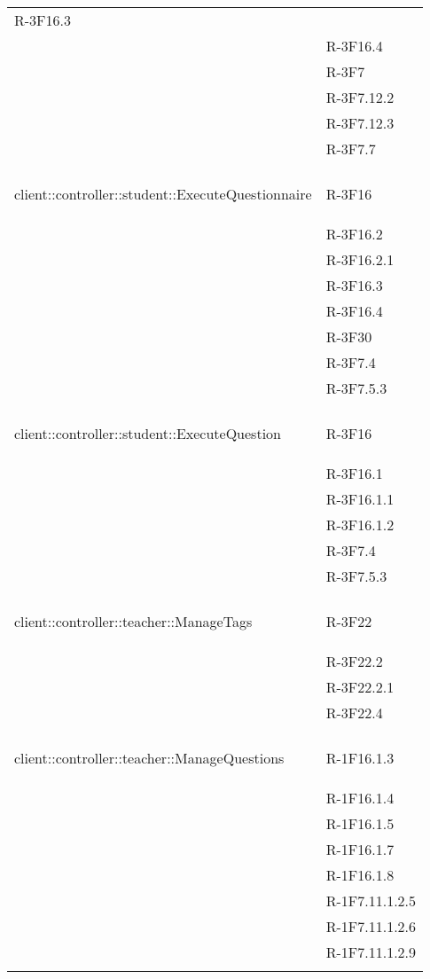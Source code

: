 \begin{longtable}{l p{3cm}}
	R-3F16.3 \tabularnewline &
	
	R-3F16.4 \tabularnewline &
	
	R-3F7 \tabularnewline &
	
	R-3F7.12.2 \tabularnewline &
	
	R-3F7.12.3 \tabularnewline &
	
	R-3F7.7 \tabularnewline &\tabularnewline
	\hline
	\hypertarget{client::controller::student::ExecuteQuestionnaire}{client::controller::student::ExecuteQuestionnaire} & R-3F16 \tabularnewline &
	
	R-3F16.2 \tabularnewline &
	
	R-3F16.2.1 \tabularnewline &
	
	R-3F16.3 \tabularnewline &
	
	R-3F16.4 \tabularnewline &
	
	R-3F30 \tabularnewline &
	
	R-3F7.4 \tabularnewline &
	
	R-3F7.5.3 \tabularnewline &\tabularnewline
	\hline
	\hypertarget{client::controller::student::ExecuteQuestion}{client::controller::student::ExecuteQuestion} & R-3F16 \tabularnewline &
	
	R-3F16.1 \tabularnewline &
	
	R-3F16.1.1 \tabularnewline &
	
	R-3F16.1.2 \tabularnewline &
	
	R-3F7.4 \tabularnewline &
	
	R-3F7.5.3 \tabularnewline &\tabularnewline
	\hline
	\hypertarget{client::controller::teacher::ManageTags}{client::controller::teacher::ManageTags} & R-3F22 \tabularnewline &
	
	R-3F22.2 \tabularnewline &
	
	R-3F22.2.1 \tabularnewline &
	
	R-3F22.4 \tabularnewline &\tabularnewline
	\hline
	\hypertarget{client::controller::teacher::ManageQuestions}{client::controller::teacher::ManageQuestions} & R-1F16.1.3 \tabularnewline &
	
	R-1F16.1.4 \tabularnewline &
	
	R-1F16.1.5 \tabularnewline &
	
	R-1F16.1.7 \tabularnewline &
	
	R-1F16.1.8 \tabularnewline &
	
	R-1F7.11.1.2.5 \tabularnewline &
	
	R-1F7.11.1.2.6 \tabularnewline &
	
	R-1F7.11.1.2.9 \tabularnewline &
	

\end{longtable}
